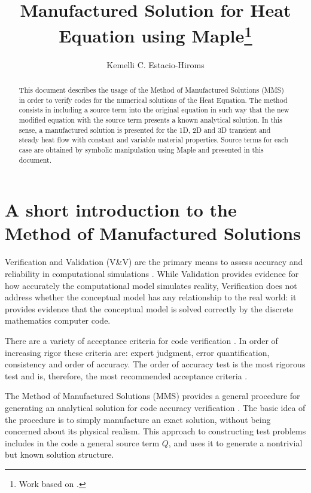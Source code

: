 \documentclass[a4paper,10pt]{article}
\title{Manufactured Solution for Heat Equation using Maple\footnote{Work based on \cite{Kirk2009}.}}
\author{Kemelli C. Estacio-Hiroms}
\begin{document}
\maketitle

\begin{abstract}
This document describes the usage of the Method of Manufactured Solutions (MMS) in order to verify codes for the numerical solutions of the Heat Equation. The method consists in including a source term into the original equation in such way that the new modified equation with the source term presents a known analytical solution. In this sense, a manufactured solution is presented for the 1D, 2D and 3D transient and steady heat flow with constant and variable material properties. Source terms for each case are obtained by symbolic manipulation using Maple and presented in this document.
\end{abstract}

\section{A short introduction to the Method of Manufactured Solutions}

Verification and Validation (V\&V) are the primary means to assess accuracy and reliability in computational
simulations \cite{Oberkampf2002,Oberkampf2008}. While Validation provides evidence for how accurately the computational
model simulates reality, Verification does not address whether the conceptual model has any relationship to the real
world: it provides evidence that the conceptual model is solved correctly by the discrete mathematics
computer code. 

There are a variety of acceptance criteria for code verification \cite{Roy2004}. In order of increasing
rigor these criteria are: expert judgment, error quantification, consistency and  order of accuracy. The order
of accuracy test is the most rigorous test and is, therefore, the most recommended acceptance criteria \cite{Roy2004}.

The Method of Manufactured Solutions (MMS) provides a general procedure for generating an analytical solution for code accuracy verification \cite{Roache2002,Bond2007}. The basic idea of the procedure is to simply manufacture an exact solution, without being concerned about its physical realism. This approach to constructing test problems includes in the code a general  source term $Q$, and uses it to generate a nontrivial but known solution structure. 
\end{document}

